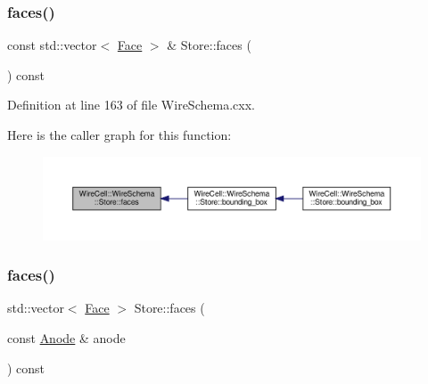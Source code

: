 \subsubsection{\texorpdfstring{faces()}{faces()}\hspace{0.1cm}{\footnotesize\ttfamily [1/2]}}
{\footnotesize\ttfamily const std\+::vector$<$ \hyperlink{struct_wire_cell_1_1_wire_schema_1_1_face}{Face} $>$ \& Store\+::faces (\begin{DoxyParamCaption}{ }\end{DoxyParamCaption}) const}



Definition at line 163 of file Wire\+Schema.\+cxx.

Here is the caller graph for this function\+:
\nopagebreak
\begin{figure}[H]
\begin{center}
\leavevmode
\includegraphics[width=350pt]{class_wire_cell_1_1_wire_schema_1_1_store_af499deefaf681bf7cb59cb564250504f_icgraph}
\end{center}
\end{figure}
\mbox{\label{class_wire_cell_1_1_wire_schema_1_1_store_adbbe257301b3fb7d9c511569324c56f6}} 
\subsubsection{\texorpdfstring{faces()}{faces()}\hspace{0.1cm}{\footnotesize\ttfamily [2/2]}}
{\footnotesize\ttfamily std\+::vector$<$ \hyperlink{struct_wire_cell_1_1_wire_schema_1_1_face}{Face} $>$ Store\+::faces (\begin{DoxyParamCaption}\item[{const \hyperlink{struct_wire_cell_1_1_wire_schema_1_1_anode}{Anode} \&}]{anode }\end{DoxyParamCaption}) const}



